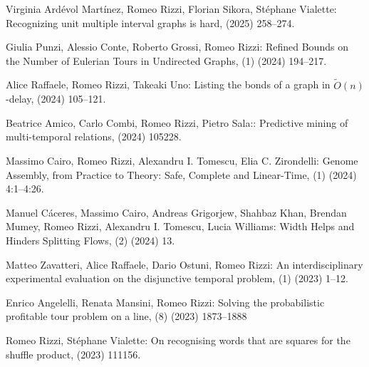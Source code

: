 \begin{etaremune}
  \vspace{-3.0mm}
  \item {\sc Virginia Ardévol Martínez, Romeo Rizzi, Florian Sikora, Stéphane Vialette:}
   \newblock Recognizing unit multiple interval graphs is hard,
    (2025) 258--274.

  \item {\sc Giulia Punzi, Alessio Conte, Roberto Grossi, Romeo Rizzi:}
   \newblock Refined Bounds on the Number of Eulerian Tours in Undirected Graphs,
   (1) (2024) 194--217.
   
  \item {\sc Alice Raffaele, Romeo Rizzi, Takeaki Uno:}
   \newblock Listing the bonds of a graph in $\tilde{O}(n)$-delay,
    (2024) 105--121.
   
  \item {\sc Beatrice Amico, Carlo Combi, Romeo Rizzi, Pietro Sala::}
   \newblock Predictive mining of multi-temporal relations,
    (2024) 105228.
   
  \item {\sc Massimo Cairo, Romeo Rizzi, Alexandru I. Tomescu, Elia C. Zirondelli:}
   \newblock Genome Assembly, from Practice to Theory: Safe, Complete and Linear-Time,
   (1) (2024) 4:1--4:26.
   
  \item {\sc Manuel Cáceres, Massimo Cairo, Andreas Grigorjew, Shahbaz Khan, Brendan Mumey, Romeo Rizzi, Alexandru I. Tomescu, Lucia Williams:}
   \newblock Width Helps and Hinders Splitting Flows,
   (2) (2024) 13.
   
  \item {\sc Matteo Zavatteri, Alice Raffaele, Dario Ostuni, Romeo Rizzi:}
   \newblock An interdisciplinary experimental evaluation on the disjunctive temporal problem,
   (1) (2023) 1--12.

  \item {\sc Enrico Angelelli, Renata Mansini, Romeo Rizzi:}
   \newblock Solving the probabilistic profitable tour problem on a line,
   (8) (2023) 1873--1888

  \item {\sc Romeo Rizzi, Stéphane Vialette:}
   \newblock On recognising words that are squares for the shuffle product,
    (2023) 111156.


\end{etaremune}
